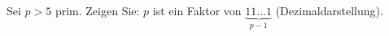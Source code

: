 
\begin{exercise}

Sei $p > 5$ prim. Zeigen Sie: $p$ ist ein Faktor von $\underbrace{11\dots1}_{p-1}$
(Dezimaldarstellung).

\end{exercise}


\begin{solution}

\phantom{}

\end{solution}

